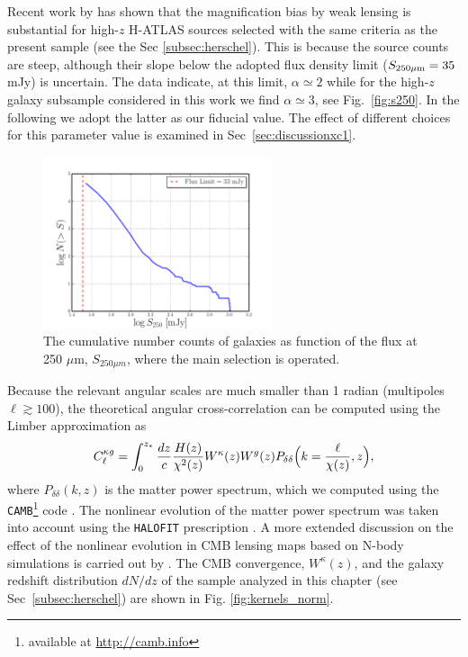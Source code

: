 Recent work by \cite{Gonzalez-Nuevo2014} has shown that the magnification bias by weak lensing is substantial for high-$z$ H-ATLAS sources selected with the same criteria as the present sample (see the Sec \eqref{subsec:herschel}). This is because the source counts are steep, although their slope below the adopted flux density limit ($S_{250\mu\rm m}=35\,$mJy) is uncertain. The data \citep{Bethermin2012} indicate, at this limit, $\alpha \simeq 2$ while for the high-$z$ galaxy subsample considered in this work we find $\alpha \simeq 3$, see Fig.~\eqref{fig:s250}. In the following we adopt the latter as our fiducial value. The effect of different choices for this parameter value is examined in Sec~\eqref{sec:discussionxc1}.
%
\begin{figure} %
\centering %
\includegraphics[width=0.6\textwidth]{Chapter3/Images/herschel_counts_250}
\caption{The cumulative number counts of galaxies as function of the flux at 250 $\mu$m, $S_{250 \mu m}$, where the main selection is operated. \label{fig:s250}}
\end{figure}
%
Because the relevant angular scales are much smaller than 1 radian (multipoles $\ell \gtrsim 100$), the theoretical angular cross-correlation can be computed using the Limber approximation \citep{Limber1953a} as
%
\begin{equation}
C_{\ell}^{\kappa g} = \int_0^{z_*} \frac{dz}{c}\frac{H(z)}{\chi^2(z)}W^{\kappa}(z)W^{g}(z)P_{\delta\delta}\Bigl(k=\frac{\ell}{\chi(z)},z\Bigr),
\label{eqn:kg}
\end{equation}
%
where $P_{\delta\delta}(k,z)$ is the matter power spectrum, which we computed using the \texttt{CAMB}\footnote{available at \url{http://camb.info}} code \citep{Lewis2000a}. The nonlinear evolution of the matter power spectrum was taken into account using the \texttt{HALOFIT} prescription \citep{Smith2003,Takahashi2012}. A more extended discussion on the effect of the nonlinear evolution in \gls{CMB} lensing maps based on N-body simulations is carried out by \cite{Antolini2014}. The \gls{CMB} convergence, $W^{\kappa}(z)$, and the galaxy redshift distribution $dN/dz$ of the sample analyzed in this chapter (see Sec~\eqref{subsec:herschel}) are shown in Fig. \eqref{fig:kernels_norm}.


